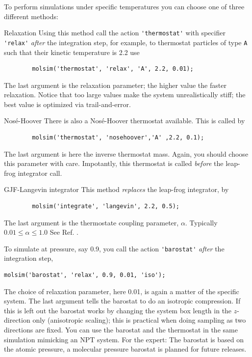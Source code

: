 \documentclass[11pt]{article}
\begin{document}
To perform simulations under specific temperatures you can choose one of three 
different methods:
\begin{description}
	\item{Relaxation} 
		Using this method call the action \verb!'thermostat'! with specifier
		\verb!'relax'! \emph{after} the integration step, for example, to thermostat particles of type 
		\verb!A! such that their kinetic temperature is 2.2 use 
		\begin{verbatim}
		molsim('thermostat', 'relax', 'A', 2.2, 0.01);
		\end{verbatim}
		The last argument is the relaxation parameter; the higher value the faster
		relaxation. Notice that too large values make the system unrealistically
		stiff; the best value is optimized via trail-and-error. 
	\item{Nos\'{e}-Hoover} 
		There is also a Nos\'{e}-Hoover thermostat available. This 
		is called by 
		\begin{verbatim}
		molsim('thermostat', 'nosehoover','A' ,2.2, 0.1);
		\end{verbatim}
		The last argument is here the inverse thermostat mass. Again, you should choose this parameter with care.
		Impotantly, this thermostat is called \emph{before} the leap-frog integrator call.
	\item{GJF-Langevin integrator}
		This method \emph{replaces} the leap-frog integrator, by 
		\begin{verbatim}
		molsim('integrate', 'langevin', 2.2, 0.5);
		\end{verbatim}
		The last argument is the thermostate coupling parameter, $\alpha$. Typically $0.01 \leq \alpha \leq 1.0$ 
		See Ref. \cite{gjf}.
\end{description}

To simulate at pressure, say 0.9, you call the action \verb!'barostat'! 
\emph{after} the integration step,
\begin{verbatim}
molsim('barostat', 'relax', 0.9, 0.01, 'iso');
\end{verbatim}
The choice of relaxation parameter, here 0.01, is again a matter of the specific
system. The last argument tells the barostat to do an isotropic compression. If
this is left out the barostat works by changing the system box length in the
$z$-direction only (anisotropic scaling); this is practical when doing sampling
as two directions are fixed. You can use the barostat and the thermostat
in the same simulation mimicking an NPT system. For the expert: The barostat is
based on the atomic pressure, a molecular pressure barostat is planned for
future releases. 
\end{document}

